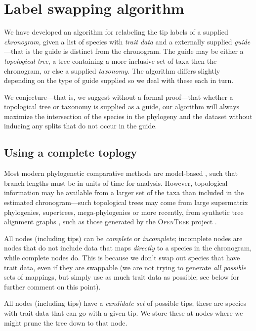 \documentclass[a4paper,11pt]{article}
\begin{document}
\section{Label swapping algorithm}

We have developed an algorithm for relabeling the tip labels of a supplied \emph{chronogram}, given a list of species with \emph{trait data} and a externally supplied \emph{guide}---that is the guide is distinct from the chronogram. The guide may be either a \emph{topological tree}, a tree containing a more inclusive set of taxa then the chronogram, or else a supplied \emph{taxonomy}. The algorithm differs slightly depending on the type of guide supplied so we deal with these each in turn.

We conjecture---that is, we suggest without a formal proof---that whether a topological tree or taxonomy is supplied as a guide, our algorithm will always maximize the intersection of the species in the phylogeny and the dataset without inducing any splits that do not occur in the guide.

\subsection{Using a complete toplogy}

Most modern phylogenetic comparative methods are model-based \citep[recently reviewed by][]{PennellHarmon}, such that branch lengths must be in units of time for analysis. However, topological information may be available from a larger set of the taxa than included in the estimated chronogram---such topological trees may come from large supermatrix phylogenies, supertrees, mega-phylogenies \citep[\emph{sensu}][]{Smithmega} or more recently, from synthetic tree alignment graphs \citep{Smith2013}, such as those generated by the \textsc{OpenTree} project \citep{OpenTree}.

All nodes (including tips) can be \emph{complete} or \emph{incomplete}; incomplete nodes are nodes that do not include data that maps \emph{directly} to a species in the chronogram, while complete nodes do.  This is because we don't swap out species that have trait data, even if they are swappable (we are not trying to generate \emph{all possible} sets of mappings, but simply use as much trait data as possible; see below for further comment on this point).

All nodes (including tips) have a \emph{candidate set} of possible tips; these are species with trait data that can go with a given tip.  We store these at nodes where we might prune the tree down to that node.
\end{document}
